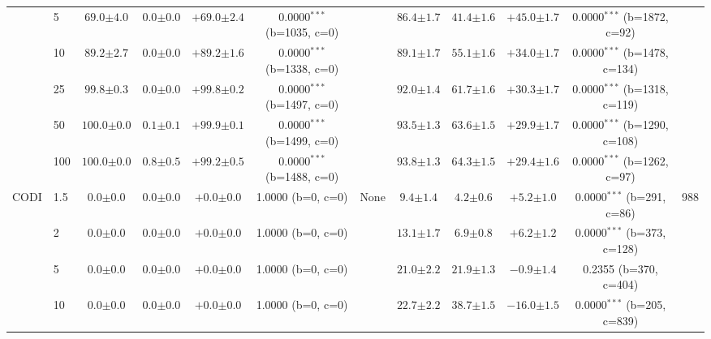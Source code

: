 \begin{table}[h!]
\begin{tabular}{l l | cccc c | cccc c}
 & 5 & $69.0 {\scriptstyle \pm 4.0}$ & $0.0 {\scriptstyle \pm 0.0}$ & $+69.0 {\scriptstyle \pm 2.4}$ & 0.0000$^{***}$ (b=1035, c=0) &  & $86.4 {\scriptstyle \pm 1.7}$ & $41.4 {\scriptstyle \pm 1.6}$ & $+45.0 {\scriptstyle \pm 1.7}$ & 0.0000$^{***}$ (b=1872, c=92) &  \\
 & 10 & $89.2 {\scriptstyle \pm 2.7}$ & $0.0 {\scriptstyle \pm 0.0}$ & $+89.2 {\scriptstyle \pm 1.6}$ & 0.0000$^{***}$ (b=1338, c=0) &  & $89.1 {\scriptstyle \pm 1.7}$ & $55.1 {\scriptstyle \pm 1.6}$ & $+34.0 {\scriptstyle \pm 1.7}$ & 0.0000$^{***}$ (b=1478, c=134) &  \\
 & 25 & $99.8 {\scriptstyle \pm 0.3}$ & $0.0 {\scriptstyle \pm 0.0}$ & $+99.8 {\scriptstyle \pm 0.2}$ & 0.0000$^{***}$ (b=1497, c=0) &  & $92.0 {\scriptstyle \pm 1.4}$ & $61.7 {\scriptstyle \pm 1.6}$ & $+30.3 {\scriptstyle \pm 1.7}$ & 0.0000$^{***}$ (b=1318, c=119) &  \\
 & 50 & $100.0 {\scriptstyle \pm 0.0}$ & $0.1 {\scriptstyle \pm 0.1}$ & $+99.9 {\scriptstyle \pm 0.1}$ & 0.0000$^{***}$ (b=1499, c=0) &  & $93.5 {\scriptstyle \pm 1.3}$ & $63.6 {\scriptstyle \pm 1.5}$ & $+29.9 {\scriptstyle \pm 1.7}$ & 0.0000$^{***}$ (b=1290, c=108) &  \\
 & 100 & $100.0 {\scriptstyle \pm 0.0}$ & $0.8 {\scriptstyle \pm 0.5}$ & $+99.2 {\scriptstyle \pm 0.5}$ & 0.0000$^{***}$ (b=1488, c=0) &  & $93.8 {\scriptstyle \pm 1.3}$ & $64.3 {\scriptstyle \pm 1.5}$ & $+29.4 {\scriptstyle \pm 1.6}$ & 0.0000$^{***}$ (b=1262, c=97) &  \\
\midrule
CODI & 1.5 & $0.0 {\scriptstyle \pm 0.0}$ & $0.0 {\scriptstyle \pm 0.0}$ & $+0.0 {\scriptstyle \pm 0.0}$ & 1.0000 (b=0, c=0) & None & $9.4 {\scriptstyle \pm 1.4}$ & $4.2 {\scriptstyle \pm 0.6}$ & $+5.2 {\scriptstyle \pm 1.0}$ & 0.0000$^{***}$ (b=291, c=86) & 988 \\
 & 2 & $0.0 {\scriptstyle \pm 0.0}$ & $0.0 {\scriptstyle \pm 0.0}$ & $+0.0 {\scriptstyle \pm 0.0}$ & 1.0000 (b=0, c=0) &  & $13.1 {\scriptstyle \pm 1.7}$ & $6.9 {\scriptstyle \pm 0.8}$ & $+6.2 {\scriptstyle \pm 1.2}$ & 0.0000$^{***}$ (b=373, c=128) &  \\
 & 5 & $0.0 {\scriptstyle \pm 0.0}$ & $0.0 {\scriptstyle \pm 0.0}$ & $+0.0 {\scriptstyle \pm 0.0}$ & 1.0000 (b=0, c=0) &  & $21.0 {\scriptstyle \pm 2.2}$ & $21.9 {\scriptstyle \pm 1.3}$ & $-0.9 {\scriptstyle \pm 1.4}$ & 0.2355 (b=370, c=404) &  \\
 & 10 & $0.0 {\scriptstyle \pm 0.0}$ & $0.0 {\scriptstyle \pm 0.0}$ & $+0.0 {\scriptstyle \pm 0.0}$ & 1.0000 (b=0, c=0) &  & $22.7 {\scriptstyle \pm 2.2}$ & $38.7 {\scriptstyle \pm 1.5}$ & $-16.0 {\scriptstyle \pm 1.5}$ & 0.0000$^{***}$ (b=205, c=839) &  \\

\end{tabular}
\end{table}
